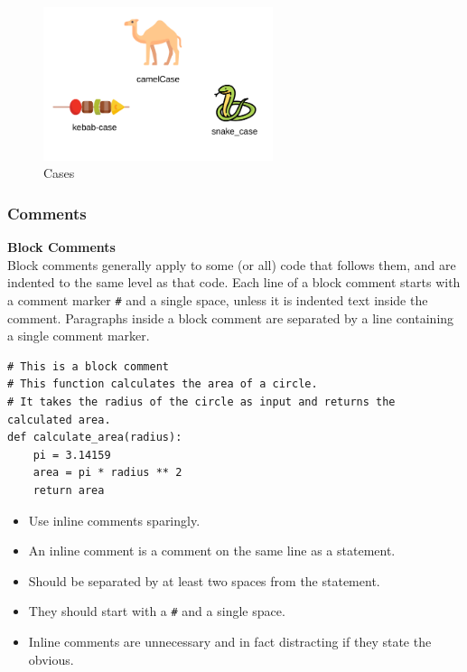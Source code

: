 \begin{figure}[h!]
    \centering
    \includegraphics[width=0.6\textwidth]{images/cases2.png}
    \caption{Cases}
    \label{fig:cc-1}
\end{figure}

\newpage
\subsubsection{Comments}
\textbf{Block Comments}\\
Block comments generally apply to some (or all) code that follows them, and are indented to the same level as that code. Each line of a block comment starts with a comment marker \texttt{\#} and a single space, unless it is indented text inside the comment. Paragraphs inside a block comment are separated by a line containing a single comment marker.\\

\begin{codebox}
\begin{verbatim}
# This is a block comment
# This function calculates the area of a circle.
# It takes the radius of the circle as input and returns the calculated area.
def calculate_area(radius):
    pi = 3.14159
    area = pi * radius ** 2
    return area
\end{verbatim}
\end{codebox}


\begin{itemize}
\item Use inline comments sparingly.
\item An inline comment is a comment on the same line as a statement. 
\item Should be separated by at least two spaces from the statement. 
\item They should start with a \texttt{\#} and a single space.
\item Inline comments are unnecessary and in fact distracting if they state the obvious.
\end{itemize}


